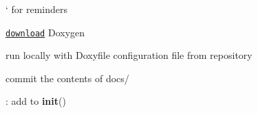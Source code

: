 
\begin{DoxyRefList}
\item[\label{todo__todo000050}%
\Hypertarget{todo__todo000050}%
Page \hyperlink{md__r_e_a_d_m_e}{Mu\+MoT} ]` for reminders
\begin{DoxyItemize}
\item \href{http://www.stack.nl/~dimitri/doxygen/download.html}{\tt download} Doxygen
\item run locally with {\ttfamily Doxyfile} configuration file from repository
\item commit the contents of {\ttfamily docs/} 
\end{DoxyItemize}
\item[\label{todo__todo000042}%
\Hypertarget{todo__todo000042}%
Global \hyperlink{class_mu_mo_t_1_1_mu_mo_tbifurcation_view_a797e92fe19ce2636a49bf1400a69fc49}{Mu\+Mo\+Tbifurcation\+View.\+\_\+py\+D\+Scont} ]\+: add to {\bfseries init}() 


\end{DoxyRefList}
